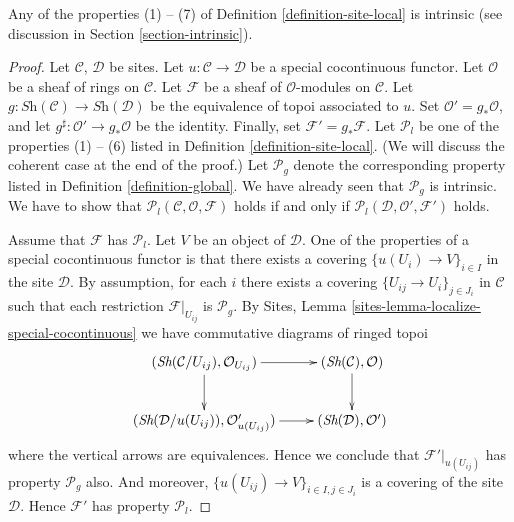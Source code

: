 \begin{lemma}
\label{lemma-special-locally-free}
Any of the properties (1) -- (7) of Definition \ref{definition-site-local}
is intrinsic (see discussion in Section \ref{section-intrinsic}).
\end{lemma}

\begin{proof}
Let $\mathcal{C}$, $\mathcal{D}$ be sites.
Let $u : \mathcal{C} \to \mathcal{D}$ be a special cocontinuous functor.
Let $\mathcal{O}$ be a sheaf of rings on $\mathcal{C}$.
Let $\mathcal{F}$ be a sheaf of $\mathcal{O}$-modules on $\mathcal{C}$.
Let $g : \textit{Sh}(\mathcal{C}) \to \textit{Sh}(\mathcal{D})$
be the equivalence of topoi associated to $u$.
Set $\mathcal{O}' = g_*\mathcal{O}$, and let
$g^\sharp : \mathcal{O}' \to g_*\mathcal{O}$ be the identity.
Finally, set $\mathcal{F}' = g_*\mathcal{F}$.
Let $\mathcal{P}_l$ be one of the properties (1) -- (6) listed in
Definition \ref{definition-site-local}.
(We will discuss the coherent case at the end of the proof.)
Let $\mathcal{P}_g$ denote the corresponding property listed in
Definition \ref{definition-global}. We have already seen that
$\mathcal{P}_g$ is intrinsic.
We have to show that
$\mathcal{P}_l(\mathcal{C}, \mathcal{O}, \mathcal{F})$
holds if and only if
$\mathcal{P}_l(\mathcal{D}, \mathcal{O}', \mathcal{F}')$
holds.

\medskip\noindent
Assume that $\mathcal{F}$ has $\mathcal{P}_l$.
Let $V$ be an object of $\mathcal{D}$.
One of the properties of a special cocontinuous functor is that there exists
a covering $\{u(U_i) \to V\}_{i \in I}$ in the site $\mathcal{D}$.
By assumption, for each $i$ there exists a covering
$\{U_{ij} \to U_i\}_{j \in J_i}$ in $\mathcal{C}$ such that
each restriction $\mathcal{F}|_{U_{ij}}$ is $\mathcal{P}_g$. By
Sites, Lemma \ref{sites-lemma-localize-special-cocontinuous}
we have commutative diagrams of ringed topoi
$$
\xymatrix{
(\textit{Sh}(\mathcal{C}/U_{ij}), \mathcal{O}_{U_{ij}}) \ar[r] \ar[d] &
(\textit{Sh}(\mathcal{C}), \mathcal{O}) \ar[d] \\
(\textit{Sh}(\mathcal{D}/u(U_{ij})), \mathcal{O}'_{u(U_{ij})}) \ar[r] &
(\textit{Sh}(\mathcal{D}), \mathcal{O}')
}
$$
where the vertical arrows are equivalences. Hence we conclude that
$\mathcal{F}'|_{u(U_{ij})}$ has property $\mathcal{P}_g$ also.
And moreover, $\{u(U_{ij}) \to V\}_{i \in I, j \in J_i}$ is a
covering of the site $\mathcal{D}$. Hence $\mathcal{F}'$ has
property $\mathcal{P}_l$.


\end{proof}
